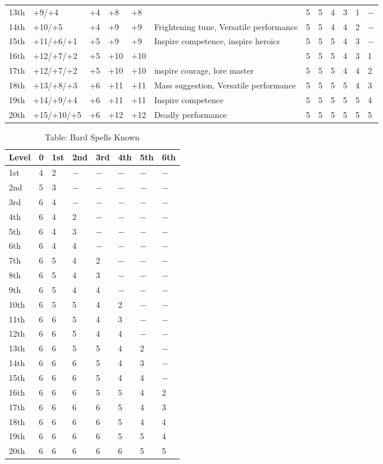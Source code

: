 \begin{table*}[]
\begin{tabularx}{\linewidth}{lp{5em}p{1.5em}p{1.5em}p{1.5em}Xllllll}
13th & +9/+4 & +4 & +8 & +8 &  & 5 & 5 & 4 & 3 & 1 & $-$\\
14th & +10/+5 & +4 & +9 & +9 & Frightening tune, Versatile performance & 5 & 5 & 4 & 4 & 2 & $-$\\
15th & +11/+6/+1 & +5 & +9 & +9 & Inspire competence, inspire heroics & 5 & 5 & 5 & 4 & 3 & $-$\\
16th & +12/+7/+2 & +5 & +10 & +10 &  & 5 & 5 & 5 & 4 & 3 & 1\\
17th & +12/+7/+2 & +5 & +10 & +10 & inspire courage, lore master & 5 & 5 & 5 & 4 & 4 & 2\\
18th & +13/+8/+3 & +6 & +11 & +11 & Mass suggestion, Versatile performance & 5 & 5 & 5 & 5 & 4 & 3\\
19th & +14/+9/+4 & +6 & +11 & +11 & Inspire competence & 5 & 5 & 5 & 5 & 5 & 4\\
20th & +15/+10/+5 & +6 & +12 & +12 & Deadly performance & 5 & 5 & 5 & 5 & 5 & 5\\
\end{tabularx}
\end{table*}

\begin{table}[]
\caption{Table: Bard Spells Known}
\sffamily
\begin{tabular}{llllllll}
\textbf{Level}&\textbf{0}&\textbf{1st}&\textbf{2nd}&\textbf{3rd}&\textbf{4th}&\textbf{5th}&\textbf{6th}\\
\hline
1st & 4 & 2 & $-$ & $-$ & $-$ & $-$ & $-$\\
2nd & 5 & 3 & $-$ & $-$ & $-$ & $-$ & $-$\\
3rd & 6 & 4 & $-$ & $-$ & $-$ & $-$ & $-$\\
4th & 6 & 4 & 2 & $-$ & $-$ & $-$ & $-$\\
5th & 6 & 4 & 3 & $-$ & $-$ & $-$ & $-$\\
6th & 6 & 4 & 4 & $-$ & $-$ & $-$ & $-$\\
7th & 6 & 5 & 4 & 2 & $-$ & $-$ & $-$\\
8th & 6 & 5 & 4 & 3 & $-$ & $-$ & $-$\\
9th & 6 & 5 & 4 & 4 & $-$ & $-$ & $-$\\
10th & 6 & 5 & 5 & 4 & 2 & $-$ & $-$\\
11th & 6 & 6 & 5 & 4 & 3 & $-$ & $-$\\
12th & 6 & 6 & 5 & 4 & 4 & $-$ & $-$\\
13th & 6 & 6 & 5 & 5 & 4 & 2 & $-$\\
14th & 6 & 6 & 6 & 5 & 4 & 3 & $-$\\
15th & 6 & 6 & 6 & 5 & 4 & 4 & $-$\\
16th & 6 & 6 & 6 & 5 & 5 & 4 & 2\\
17th & 6 & 6 & 6 & 6 & 5 & 4 & 3\\
18th & 6 & 6 & 6 & 6 & 5 & 4 & 4\\
19th & 6 & 6 & 6 & 6 & 5 & 5 & 4\\
20th & 6 & 6 & 6 & 6 & 6 & 5 & 5\\
\end{tabular}
\end{table}

